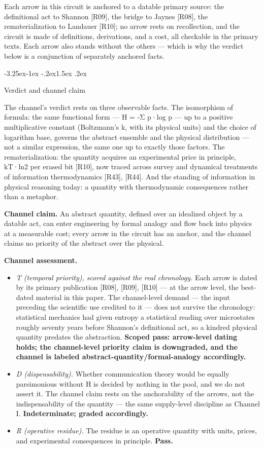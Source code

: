 \documentclass[11pt,a4paper]{article}
\makeatletter
\renewcommand\subsection{\@startsection{subsection}{2}{\z@}%
  {-3.25ex\@plus -1ex \@minus -.2ex}{1.5ex \@plus .2ex}%
  {\normalfont\large\bfseries\raggedright}}
\makeatother
\begin{document}
Each arrow in this circuit is anchored to a datable primary source: the definitional act to Shannon [R09], the bridge to Jaynes [R08], the rematerialization to Landauer [R10]; no arrow rests on recollection, and the circuit is made of definitions, derivations, and a cost, all checkable in the primary texts. Each arrow also stands without the others — which is why the verdict below is a conjunction of separately anchored facts.

\subsection{Verdict and channel claim}

The channel's verdict rests on three observable facts. The isomorphism of formula: the same functional form — H = -Σ p·log p — up to a positive multiplicative constant (Boltzmann's k, with its physical units) and the choice of logarithm base, governs the abstract ensemble and the physical distribution — not a similar expression, the same one up to exactly those factors. The rematerialization: the quantity acquires an experimental price in principle, kT·ln2 per erased bit [R10], now traced across survey and dynamical treatments of information thermodynamics [R43], [R44]. And the standing of information in physical reasoning today: a quantity with thermodynamic consequences rather than a metaphor.

\textbf{Channel claim.} An abstract quantity, defined over an idealized object by a datable act, can enter engineering by formal analogy and flow back into physics at a measurable cost; every arrow in the circuit has an anchor, and the channel claims no priority of the abstract over the physical.

\textbf{Channel assessment.}

\begin{itemize}[leftmargin=1.6em,itemsep=2pt,parsep=0pt,topsep=3pt]
\item \textit{T (temporal priority), scored against the real chronology.} Each arrow is dated by its primary publication [R08], [R09], [R10] — at the arrow level, the best-dated material in this paper. The channel-level demand — the input preceding the scientific use credited to it — does not survive the chronology: statistical mechanics had given entropy a statistical reading over microstates roughly seventy years before Shannon's definitional act, so a kindred physical quantity predates the abstraction. \textbf{Scoped pass: arrow-level dating holds; the channel-level priority claim is downgraded, and the channel is labeled abstract-quantity/formal-analogy accordingly.}
\item \textit{D (dispensability).} Whether communication theory would be equally parsimonious without H is decided by nothing in the pool, and we do not assert it. The channel claim rests on the anchorability of the arrows, not the indispensability of the quantity — the same supply-level discipline as Channel I. \textbf{Indeterminate; graded accordingly.}
\item \textit{R (operative residue).} The residue is an operative quantity with units, prices, and experimental consequences in principle. \textbf{Pass.}
\end{itemize}
\end{document}
